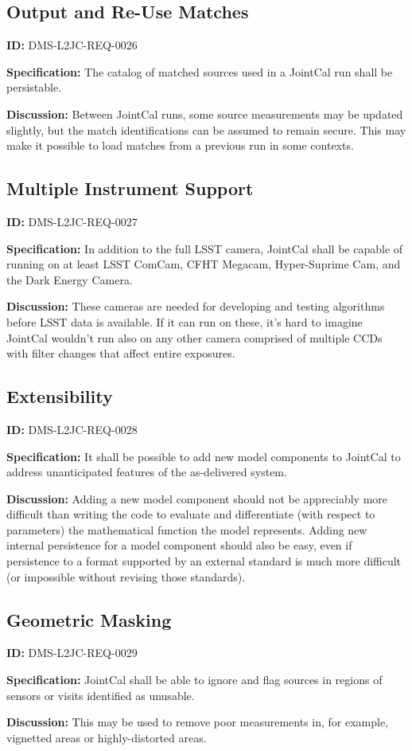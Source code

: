 \documentclass[SE,toc,lsstdraft]{lsstdoc}
\begin{document}
\subsection{Output and Re-Use Matches}

\label{DMS-L2JC-REQ-0026}
\textbf{ID:} DMS-L2JC-REQ-0026

\textbf{Specification:}
The catalog of matched sources used in a JointCal run shall be persistable.

\textbf{Discussion:}
Between JointCal runs, some source measurements may be updated slightly, but the match identifications can be assumed to remain secure.  This may make it possible to load matches from a previous run in some contexts.

\subsection{Multiple Instrument Support}

\label{DMS-L2JC-REQ-0027}
\textbf{ID:} DMS-L2JC-REQ-0027

\textbf{Specification:}
In addition to the full LSST camera, JointCal shall be capable of running on at least LSST ComCam, CFHT Megacam, Hyper-Suprime Cam, and the Dark Energy Camera.

\textbf{Discussion:}
These cameras are needed for developing and testing algorithms before LSST data is available.  If it can run on these, it's hard to imagine JointCal wouldn't run also on any other camera comprised of multiple CCDs with filter changes that affect entire exposures.

\subsection{Extensibility}

\label{DMS-L2JC-REQ-0028}
\textbf{ID:} DMS-L2JC-REQ-0028

\textbf{Specification:}
It shall be possible to add new model components to JointCal to address unanticipated features of the as-delivered system.

\textbf{Discussion:}
Adding a new model component should not be appreciably more difficult than writing the code to evaluate and differentiate (with respect to parameters) the mathematical function the model represents.  Adding new internal persistence for a model component should also be easy, even if persistence to a format supported by an external standard is much more difficult (or impossible without revising those standards).

\subsection{Geometric Masking}

\label{DMS-L2JC-REQ-0029}
\textbf{ID:} DMS-L2JC-REQ-0029

\textbf{Specification:}
JointCal shall be able to ignore and flag sources in regions of sensors or visits identified as unusable.

\textbf{Discussion:}
This may be used to remove poor measurements in, for example, vignetted areas or highly-distorted areas.


\end{document}
